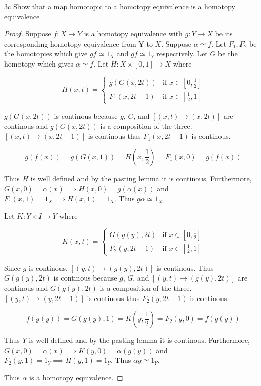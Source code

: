 \documentclass{article}
\begin{document}
\begin{claim}{3c}\label{Claim 3c.}
    Show that a map homotopic to a homotopy equivalence is a homotopy equivalence
\end{claim}
\begin{proof}
    Suppose $f: X \to Y$ is a homotopy equivalence with $g: Y \to X$ be its corresponding homotopy equivalence from Y to $X$. Suppose $\alpha \simeq f$. Let $F_1, F_2$ be the homotopies which give $gf \simeq 1_X$ and $gf \simeq 1_Y$ respectively. Let $G$ be the homotopy which gives $\alpha \simeq f$. Let $H: X \times [0, 1] \to X$ where 
    
    \begin{equation*}
        H(x, t) = \begin{cases*}
            g(G(x, 2t)) & \text{if $x \in \left[0, \frac{1}{2}\right]$} \\ 
            F_1(x, 2t - 1) & \text{if $x \in \left[\frac{1}{2}, 1\right]$}
        \end{cases*}
    \end{equation*}

    $g(G(x, 2t))$ is continous because $g$, $G$, and $[(x, t) \to (x, 2t)]$ are continous and $g(G(x, 2t))$ is a composition of the three. $[(x, t) \to (x, 2t - 1)]$ is continous thus $F_1(x, 2t - 1)$ is continous. 
    
    \[g(f(x)) = g(G(x, 1)) = H\left(x, \frac{1}{2}\right) = F_1(x, 0) = g(f(x))\]

    Thus $H$ is well defined and by the pasting lemma it is continous. Furthermore, $G(x, 0) = \alpha(x) \implies H(x, 0) = g(\alpha(x))$ and $F_1(x, 1) = 1_X \implies H(x, 1) = 1_X$. Thus $g \alpha \simeq 1_X$
    
    Let $K: Y \times I \to Y$ where 
    
    \begin{equation*}
        K(x, t) = \begin{cases*}
            G(g(y), 2t) & \text{if $x \in \left[0, \frac{1}{2}\right]$} \\ 
            F_2(y, 2t - 1) & \text{if $x \in \left[\frac{1}{2}, 1\right]$}
        \end{cases*}
    \end{equation*}


    Since $g$ is continous, $[(y, t) \to (g(y), 2t)]$ is continous. Thus $G(g(y), 2t)$ is continous because $g$, $G$, and $[(y, t) \to (g(y), 2t)]$ are continous and $G(g(y), 2t)$ is a composition of the three. $[(y, t) \to (y, 2t - 1)]$ is continous thus $F_2(y, 2t - 1)$ is continous. 

    \[f(g(y)) =  G(g(y), 1) = K\left(y, \frac{1}{2}\right) = F_2(y, 0) = f(g(y))\]

    Thus $Y$ is well defined and by the pasting lemma it is continous. Furthermore, $G(x, 0) = \alpha(x) \implies K(y, 0) = \alpha(g(y))$ and $F_2(y, 1) = 1_Y \implies H(y, 1) = 1_Y$. Thus $\alpha g \simeq 1_Y$. 

    Thus $\alpha$ is a homotopy equivalence. 

\end{proof}
\end{document}
